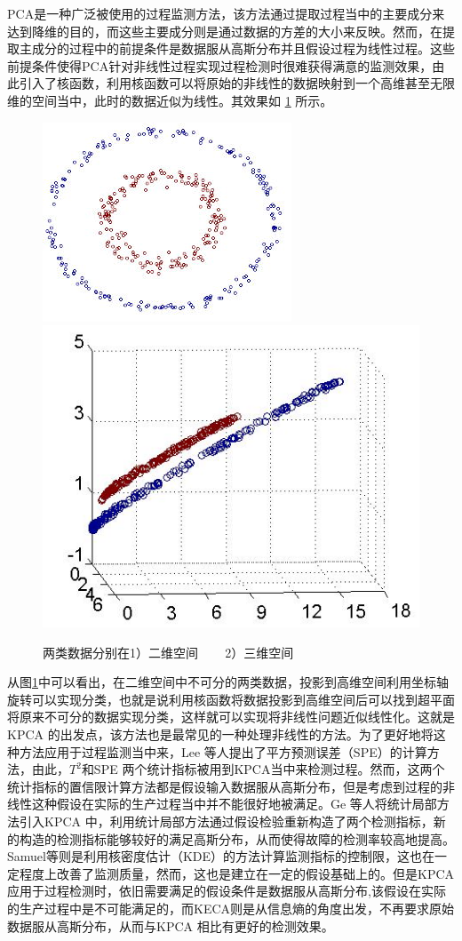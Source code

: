 PCA是一种广泛被使用的过程监测方法，该方法通过提取过程当中的主要成分来达到降维的目的，而这些主要成分则是通过数据的方差的大小来反映。然而，在提取主成分的过程中的前提条件是数据服从高斯分布并且假设过程为线性过程。这些前提条件使得PCA针对非线性过程实现过程检测时很难获得满意的监测效果，由此引入了核函数，利用核函数可以将原始的非线性的数据映射到一个高维甚至无限维的空间当中，此时的数据近似为线性。其效果如 \ref{Fig2D3D} 所示。
\begin{figure}[htb]
\centering
\includegraphics[scale=0.6]{./Pictures/kernel2D.jpg}
\includegraphics[scale=0.6]{./Pictures/kernel3D.jpg}
\caption{两类数据分别在1）二维空间 ~~~ 2）三维空间}
\label{Fig2D3D}
\end{figure}
从图\ref{Fig2D3D}中可以看出，在二维空间中不可分的两类数据，投影到高维空间利用坐标轴旋转可以实现分类，也就是说利用核函数将数据投影到高维空间后可以找到超平面将原来不可分的数据实现分类，这样就可以实现将非线性问题近似线性化。这就是KPCA 的出发点，该方法也是最常见的一种处理非线性的方法。为了更好地将这种方法应用于过程监测当中来，Lee 等人提出了平方预测误差（SPE）的计算方法，由此，$T^2$和SPE 两个统计指标被用到KPCA当中来检测过程。然而，这两个统计指标的置信限计算方法都是假设输入数据服从高斯分布，但是考虑到过程的非线性这种假设在实际的生产过程当中并不能很好地被满足。Ge 等人将统计局部方法引入KPCA 中，利用统计局部方法通过假设检验重新构造了两个检测指标，新的构造的检测指标能够较好的满足高斯分布，从而使得故障的检测率较高地提高。Samuel等则是利用核密度估计（KDE）的方法计算监测指标的控制限，这也在一定程度上改善了监测质量，然而，这也是建立在一定的假设基础上的。但是KPCA应用于过程检测时，依旧需要满足的假设条件是数据服从高斯分布,该假设在实际的生产过程中是不可能满足的，而KECA则是从信息熵的角度出发，不再要求原始数据服从高斯分布，从而与KPCA 相比有更好的检测效果。\\
